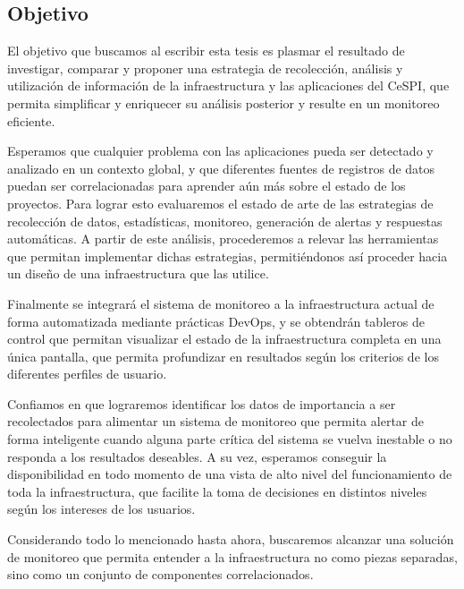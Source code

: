 \subsection{Objetivo}
\label{objetivo}

El objetivo que buscamos al escribir esta tesis es plasmar el resultado de
investigar, comparar y proponer una estrategia de recolección, análisis y
utilización de información de la infraestructura y las aplicaciones del CeSPI,
que permita simplificar y enriquecer su análisis posterior y resulte en un
monitoreo eficiente.

Esperamos que cualquier problema con las aplicaciones pueda ser detectado y
analizado en un contexto global, y que diferentes fuentes de registros de datos
puedan ser correlacionadas para aprender aún más sobre el estado de los
proyectos.  Para lograr esto evaluaremos el estado de arte de las estrategias
de recolección de datos, estadísticas, monitoreo, generación de alertas y
respuestas automáticas. A partir de este análisis, procederemos a relevar las
herramientas que permitan implementar dichas estrategias, permitiéndonos así
proceder hacia un diseño de una infraestructura que las utilice.

Finalmente se integrará el sistema de monitoreo a la infraestructura actual de
forma automatizada mediante prácticas DevOps, y se obtendrán tableros de
control que permitan visualizar el estado de la infraestructura completa en una
única pantalla, que permita profundizar en resultados según los criterios de
los diferentes perfiles de usuario.

Confiamos en que lograremos identificar los datos de importancia a ser
recolectados para alimentar un sistema de monitoreo que permita alertar de
forma inteligente cuando alguna parte crítica del sistema se vuelva inestable o
no responda a los resultados deseables. A su vez, esperamos conseguir la
disponibilidad en todo momento de una vista de alto nivel del funcionamiento de
toda la infraestructura, que facilite la toma de decisiones en distintos
niveles según los intereses de los usuarios.

Considerando todo lo mencionado hasta ahora, buscaremos alcanzar una solución
de monitoreo que permita entender a la infraestructura no como piezas
separadas, sino como un conjunto de componentes correlacionados.

